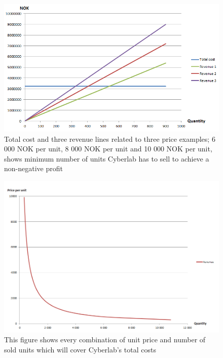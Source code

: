 \begin{figure}
\begin{center}
\includegraphics[scale=0.7]{revenuestreamquantity}
\caption[Quantity examples]{Total cost and three revenue lines related to three price examples; 6 000 NOK per unit, 8 000 NOK per unit and 10 000 NOK per unit, shows minimum number of units Cyberlab has to sell to achieve a non-negative profit}
\label{fig:RevenueStreamQuantity}
\end{center}
\end{figure}
\begin{figure}
\includegraphics[scale=0.6]{relationpriceandunits}
\caption[Relation between price per unit and number of sold units]{This figure shows every combination of unit price and number of sold units which will cover Cyberlab's total costs}
\label{fig:RelationPriceAndUnits}
\end{figure}
